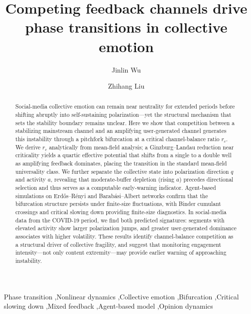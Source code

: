 \documentclass[preprint,12pt]{elsarticle}
\begin{document}
\begin{frontmatter}

\title{Competing feedback channels drive phase transitions in collective emotion}

\author[ust]{Jinlin Wu}
\author[cuhk]{Zhihang Liu}


\address[ust]{Urban Governance and Design Thrust, The Hong Kong University of Science and Technology (Guangzhou), Guangzhou 511400, China}
\address[cuhk]{Institute of Space and Earth Information Science, The Chinese University of Hong Kong, Shatin, Hong Kong, China}

\begin{abstract}
Social-media collective emotion can remain near neutrality for extended periods before shifting abruptly into self-sustaining polarization---yet the structural mechanism that sets the stability boundary remains unclear. Here we show that competition between a stabilizing mainstream channel and an amplifying user-generated channel generates this instability through a pitchfork bifurcation at a critical channel-balance ratio $r_c$. We derive $r_c$ analytically from mean-field analysis; a Ginzburg--Landau reduction near criticality yields a quartic effective potential that shifts from a single to a double well as amplifying feedback dominates, placing the transition in the standard mean-field universality class. We further separate the collective state into polarization direction $q$ and activity $a$, revealing that moderate-buffer depletion (rising $a$) precedes directional selection and thus serves as a computable early-warning indicator. Agent-based simulations on Erd\H{o}s--R\'enyi and Barab\'asi--Albert networks confirm that the bifurcation structure persists under finite-size fluctuations, with Binder cumulant crossings and critical slowing down providing finite-size diagnostics. In social-media data from the COVID-19 period, we find both predicted signatures: segments with elevated activity show larger polarization jumps, and greater user-generated dominance associates with higher volatility. These results identify channel-balance competition as a structural driver of collective fragility, and suggest that monitoring engagement intensity---not only content extremity---may provide earlier warning of approaching instability.
\end{abstract}

\begin{keyword}
Phase transition \sep Nonlinear dynamics \sep Collective emotion \sep Bifurcation \sep Critical slowing down \sep Mixed feedback \sep Agent-based model \sep Opinion dynamics
\end{keyword}

\end{frontmatter}
\end{document}
